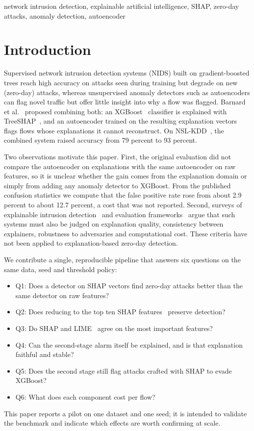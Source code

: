 \documentclass[conference]{IEEEtran}
\begin{document}
\begin{IEEEkeywords}
network intrusion detection, explainable artificial intelligence, SHAP, zero-day attacks, anomaly detection, autoencoder
\end{IEEEkeywords}

\section{Introduction}
Supervised network intrusion detection systems (NIDS) built on gradient-boosted trees reach high accuracy on attacks seen during training but degrade on new (zero-day) attacks, whereas unsupervised anomaly detectors such as autoencoders can flag novel traffic but offer little insight into why a flow was flagged. Barnard et al.~\cite{barnard2022robust} proposed combining both: an XGBoost~\cite{chen2016xgboost} classifier is explained with TreeSHAP~\cite{lundberg2020trees}, and an autoencoder trained on the resulting explanation vectors flags flows whose explanations it cannot reconstruct. On NSL-KDD~\cite{tavallaee2009nslkdd}, the combined system raised accuracy from 79 percent to 93 percent.

Two observations motivate this paper. First, the original evaluation did not compare the autoencoder on explanations with the same autoencoder on raw features, so it is unclear whether the gain comes from the explanation domain or simply from adding any anomaly detector to XGBoost. From the published confusion statistics we compute that the false positive rate rose from about 2.9 percent to about 12.7 percent, a cost that was not reported. Second, surveys of explainable intrusion detection~\cite{neupane2022xids,khan2024xids,rjoub2023survey} and evaluation frameworks~\cite{arreche2024exai,warnecke2020evaluating} argue that such systems must also be judged on explanation quality, consistency between explainers, robustness to adversaries and computational cost. These criteria have not been applied to explanation-based zero-day detection.

We contribute a single, reproducible pipeline that answers six questions on the same data, seed and threshold policy:
\begin{itemize}
\item Q1: Does a detector on SHAP vectors find zero-day attacks better than the same detector on raw features?
\item Q2: Does reducing to the top ten SHAP features~\cite{nugraha2025versatile} preserve detection?
\item Q3: Do SHAP and LIME~\cite{ribeiro2016lime} agree on the most important features?
\item Q4: Can the second-stage alarm itself be explained, and is that explanation faithful and stable?
\item Q5: Does the second stage still flag attacks crafted with SHAP to evade XGBoost?
\item Q6: What does each component cost per flow?
\end{itemize}
This paper reports a pilot on one dataset and one seed; it is intended to validate the benchmark and indicate which effects are worth confirming at scale.
\end{document}
